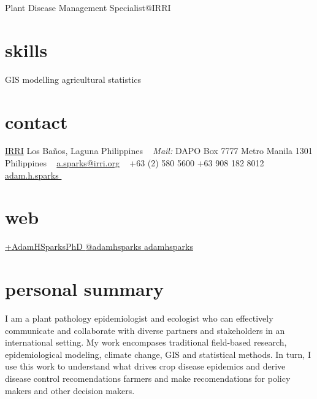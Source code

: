 \documentclass[]{friggeri-cv}
\begin{document}
       {Plant Disease Management Specialist@IRRI}


\begin{aside}
\section{skills}
\small{GIS
modelling
agricultural statistics
~
\section{contact}
\href{http://www.irri.org/}{IRRI}
Los Ba\~nos, Laguna
Philippines
~
\emph{Mail:}
DAPO Box 7777
Metro Manila
1301 Philippines
~
\href{mailto:a.sparks@irri.org}{a.sparks@irri.org}
~
+63 (2) 580 5600 \faPhone
+63 908 182 8012  \faMobilePhone
{\href{skype:adam.h.sparks?call}{adam.h.sparks }}
~
\section{web}
\href{http://plus.google.com/+AdamHSparksPhD}{+AdamHSparksPhD {\color{google.plus}\faGooglePlusSign}}
\href{https://www.twitter.com/adamhsparks/}{@adamhsparks {\color{twitter.blue}\faTwitter}}
\href{https://github.com/adamhsparks/}{adamhsparks \faGithub}}
\end{aside}

\section{personal summary}
I am a plant pathology epidemiologist and ecologist who can effectively communicate and collaborate with diverse partners and stakeholders in an international setting. My work encompases traditional field-based research, epidemiological modeling, climate change, GIS and statistical methods. In turn, I use this work to understand what drives crop disease epidemics and derive disease control recomendations farmers and make recomendations for policy makers and other decision makers.
\end{document}
